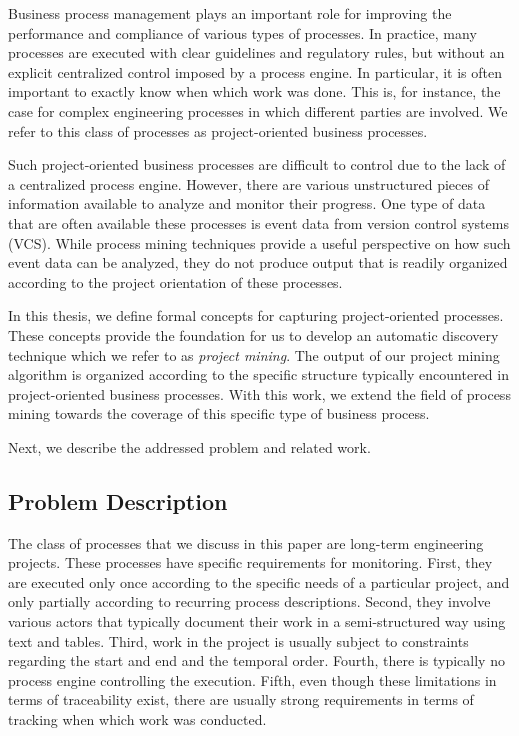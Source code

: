 \label{sec:bpm2015background}

Business process management plays an important role for improving the performance and compliance of various types of processes. In practice, many processes are executed with clear guidelines and regulatory rules, but without an explicit centralized control imposed by a process engine. In particular, it is often important to exactly know when which work was done. This is, for instance, the case for complex engineering processes in which different parties are involved. We refer to this class of processes as project-oriented business processes.

Such project-oriented business processes are difficult to control due to the lack of a centralized process engine. However, there are various unstructured pieces of information available to analyze and monitor their progress. One type of data that are often available these processes is event data from version control systems (VCS). While process mining techniques provide a useful perspective on how such event data can be analyzed, they do not produce output that is readily organized according to the project orientation of these processes.

In this thesis, we define formal concepts for capturing project-oriented processes. These concepts provide the foundation for us to develop an automatic discovery technique which we refer to as \emph{project mining}. The output of our project mining algorithm is organized according to the specific structure typically encountered in project-oriented business processes. With this work, we extend the field of process mining towards the coverage of this specific type of business process.


Next, we describe the addressed problem and related work.


\subsection{Problem Description}\label{sec:bpm2015problem}
The class of processes that we discuss in this paper are long-term engineering projects. These processes have specific requirements for monitoring. First, they are executed only once according to the specific needs of a particular project, and only partially according to recurring process descriptions. Second, they involve various actors that typically document their work in a semi-structured way using text and tables. Third, work in the project is usually subject to constraints regarding the start and end and the temporal order. Fourth, there is typically no process engine controlling the execution. Fifth, even though these limitations in terms of traceability exist, there are usually strong requirements in terms of tracking when which work was conducted.

